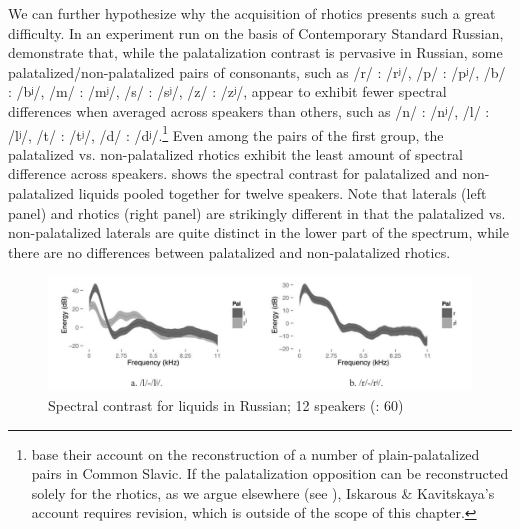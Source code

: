 \documentclass[output=paper]{langscibook}
\begin{document}
We can further hypothesize why the acquisition of rhotics presents such a great difficulty. In an experiment run on the basis of Contemporary Standard Russian, \citet{IskarousKavitskaya2018} demonstrate that, while the palatalization contrast is pervasive in Russian, some palatalized/non-palatalized pairs of consonants, such as /r/ : /rʲ/, /p/ : /pʲ/, /b/ : /bʲ/,  /m/ : /mʲ/, /s/ : /sʲ/, /z/ : /zʲ/, appear to exhibit fewer spectral differences when averaged across speakers than others, such as /n/ : /nʲ/, /l/ : /lʲ/, /t/ : /tʲ/, /d/ : /dʲ/.\footnote{\citet{IskarousKavitskaya2018} base their account on the reconstruction of a number of plain-palatalized pairs in Common Slavic. If the palatalization opposition can be reconstructed solely for the rhotics, as we argue elsewhere (see \citealt{WandlKavitskaya2023}), Iskarous \& Kavitskaya’s account requires revision, which is outside of the scope of this chapter.} Even among the pairs of the first group, the palatalized vs. non-palatalized rhotics exhibit the least amount of spectral difference across speakers.  shows the spectral contrast for palatalized and non-palatalized liquids pooled together for twelve speakers. Note that laterals (left panel) and rhotics (right panel) are strikingly different in that the palatalized vs. non-palatalized laterals are quite distinct in the lower part of the spectrum, while there are no differences between palatalized and non-palatalized rhotics.

  
\begin{figure}
\includegraphics[width=\textwidth]{figures/a14KavitskayaWandl-img003.png}
\caption{\label{fig:kavitskaya:3} Spectral contrast for liquids in Russian; 12 speakers (\citealt{IskarousKavitskaya2018}: 60)}
\end{figure}
\end{document}
